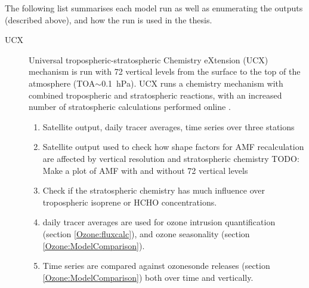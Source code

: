       The following list summarises each model run as well as enumerating the outputs (described above), and how the run is used in the thesis.
      \begin{description}
        \item[UCX]%
          Universal tropospheric-stratospheric Chemistry eXtension (UCX) mechanism is run with 72 vertical levels from the surface to the top of the atmosphere (TOA$\sim$0.1~hPa).
          UCX runs a chemistry mechanism with combined tropospheric and stratospheric reactions, with an increased number of stratospheric calculations performed online \parencite{Eastham2014}.
          \begin{enumerate}
            \item Satellite output, daily tracer averages, time series over three stations
            \item Satellite output used to check how shape factors for AMF recalculation are affected by vertical resolution and stratospheric chemistry 
            TODO: Make a plot of AMF with and without 72 vertical levels
            \item Check if the stratospheric chemistry has much influence over tropospheric isoprene or HCHO concentrations.
            \item daily tracer averages are used for ozone intrusion quantification (section \ref{Ozone:fluxcalc}), and ozone seasonality (section \ref{Ozone:ModelComparison}).
            \item Time series are compared against ozonesonde releases (section \ref{Ozone:ModelComparison}) both over time and vertically.
          \end{enumerate}
        

\end{description}
